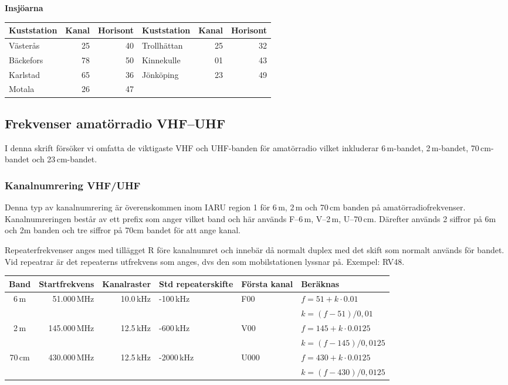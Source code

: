 \textbf{Insjöarna}

\begin{longtable}{lrr|lrr}
\textbf{Kuststation} & \textbf{Kanal} & \textbf{Horisont} & \textbf{Kuststation} & \textbf{Kanal} & \textbf{Horisont} \\
\hline
\endhead

Västerås  & 25 & 40 & Trollhättan & 25 & 32 \\
Bäckefors & 78 & 50 & Kinnekulle  & 01 & 43 \\
Karlstad  & 65 & 36 & Jönköping   & 23 & 49 \\
Motala    & 26 & 47 &             &    &    \\
\end{longtable}

\subsection{Frekvenser amatörradio VHF--UHF}

I denna skrift försöker vi omfatta de viktigaste VHF och UHF-banden för amatörradio vilket inkluderar 6\,m-bandet, 2\,m-bandet, 70\,cm-bandet och 23\,cm-bandet.

\subsubsection{Kanalnumrering VHF/UHF}

Denna typ av kanalnumrering är överenskommen inom IARU region 1 för 6\,m, 2\,m och 70\,cm banden på amatörradiofrekvenser. Kanalnumreringen består av ett prefix som anger vilket band och här används F--6\,m, V--2\,m, U--70\,cm. Därefter används 2 siffror på 6m och 2m banden och tre siffror på 70cm bandet för
att ange kanal.

Repeaterfrekvenser anges med tillägget R före kanalnumret och innebär då normalt duplex med det skift som normalt används för bandet. Vid repeatrar är det repeaterns utfrekvens som anges, dvs den som mobilstationen lyssnar på. Exempel: RV48.

\begin{tabular}{crrlll}
	\textbf{Band} & \textbf{Startfrekvens} & \textbf{Kanalraster} & \textbf{Std repeaterskifte} & \textbf{Första kanal} & \textbf{Beräknas}    \\ \hline

	6\,m &	51.000\,MHz & 10.0\,kHz & -100\,kHz & F00  & $f=51+k\cdot0.01$    \\
		&	&	&	&	& $k=(f-51)/0,01$      \\ \hline
2\,m   & 145.000\,MHz & 12.5\,kHz & -600\,kHz & V00  & $f=145+k\cdot0.0125$ \\
      &             &          &      &      & $k=(f-145)/0,0125$   \\ \hline
70\,cm & 430.000\,MHz & 12.5\,kHz & -2000\,kHz & U000 & $f=430+k\cdot0.0125$ \\
      &             &          &      &      & $k=(f-430)/0,0125$   \\ \hline
\end{tabular}

